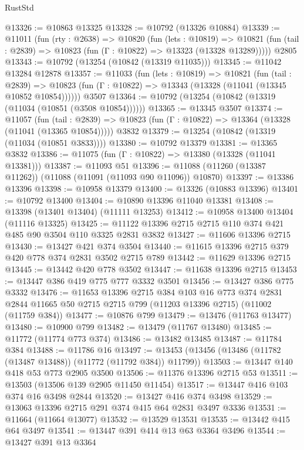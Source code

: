 \begin{lexlean}{RustStd}
\begin{coremodule}
@13326 := @10863 @13325
@13328 := @10792 (@13326 @10884)
@13339 := @11011
    (fun (rty : @2638) =>
    @10820
      (fun (lets : @10819) =>
      @10821 (fun (tail : @2839) => @10823 (fun (Γ : @10822) => @13323 (@13328 @13289)))))
    @2805
@13343 := @10792 (@13254 (@10842 (@13319 @11035)))
@13345 := @11042 @13284 @12878
@13357 := @11033
    (fun (lets : @10819) =>
    @10821
      (fun (tail : @2839) =>
      @10823 (fun (Γ : @10822) => @13343 (@13328 (@11041 (@13345 @10852 @10854))))))
    @3507
@13364 := @10792 (@13254 (@10842 (@13319 (@11034 (@10851 (@3508 @10854))))))
@13365 := @13345 @3507
@13374 := @11057
    (fun (tail : @2839) => @10823 (fun (Γ : @10822) => @13364 (@13328 (@11041 (@13365 @10854)))))
    @3832
@13379 := @13254 (@10842 (@13319 (@11034 (@10851 @3833))))
@13380 := @10792 @13379
@13381 := @13365 @3832
@13386 := @11075 (fun (Γ : @10822) => @13380 (@13328 (@11041 @13381)))
@13387 := @11093 @51
@13396 := @11088 (@11260 (@13387 @11262)) (@11088 (@11091 (@11093 @90 @11096)) @10870)
@13397 := @13386 @13396
@13398 := @10958 @13379
@13400 := @13326 (@10883 @13396)
@13401 := @10792 @13400
@13404 := @10890 @13396 @11040 @13381
@13408 := @13398 (@13401 @13404) (@11111 @13253)
@13412 := @10958 @13400 @13404 (@11116 @13325)
@13425 := @11122 @13396 @2715 @2715 @110 @374 @421 @485 @90 @3504 @110 @3325 @2831 @3832
@13427 := @11606 @13396 @2715
@13430 := @13427 @421 @374 @3504
@13440 := @11615 @13396 @2715 @379 @420 @778 @374 @2831 @3502 @2715 @789
@13442 := @11629 @13396 @2715
@13445 := @13442 @420 @778 @3502
@13447 := @11638 @13396 @2715
@13453 := @13447 @386 @419 @775 @777 @3332 @3501
@13456 := @13427 @386 @775 @3332
@13476 := @11653
    @13396
    @2715
    @384
    @103
    @16
    @773
    @374
    @2831
    @2844
    @11665
    @50
    @2715
    @2715
    @799
    (@11203 @13396 @2715)
    (@11002 (@11759 @384))
@13477 := @10876 @799
@13479 := @13476 (@11763 @13477)
@13480 := @10900 @799
@13482 := @13479 (@11767 @13480)
@13485 := @11772 (@11774 @773 @374)
@13486 := @13482 @13485
@13487 := @11784 @384
@13488 := @11786 @16
@13497 := @13453 (@13456 (@13486 (@11782 (@13487 @13488)) (@11772 (@11792 @384)) @11799))
@13503 := @13447 @140 @418 @53 @773 @2905 @3500
@13506 := @11376 @13396 @2715 @53
@13511 := @13503 (@13506 @139 @2905 @11450 @11454)
@13517 := @13447 @416 @103 @374 @16 @3498 @2844
@13520 := @13427 @416 @374 @3498
@13529 := @13063 @13396 @2715 @291 @374 @415 @64 @2831 @3497 @3336
@13531 := @11664 (@11664 @13077)
@13532 := @13529 @13531
@13535 := @13442 @415 @64 @3497
@13541 := @13447 @391 @414 @13 @63 @3364 @3496
@13544 := @13427 @391 @13 @3364

\end{coremodule}
\end{lexlean}
